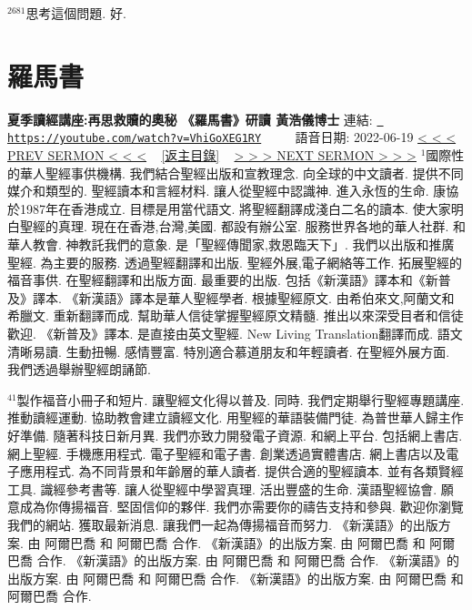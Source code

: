 \documentclass{book}
\begin{document}
$^{2681}$思考這個問題.
好.
\newpage



\section{羅馬書}
\label{sec:VhiGoXEG1RY}
\textbf{夏季讀經講座:再思救贖的奧秘 《羅馬書》研讀 黃浩儀博士}
\newline
\newline
連結: \href{https://youtube.com/watch?v=VhiGoXEG1RY}{\texttt{ https://youtube.com/watch?v=VhiGoXEG1RY}} ~~~~ 語音日期: 2022-06-19 
\newline
\newline
\hyperref[sec:7tQS0En6sh8]{\small{< < < PREV SERMON < < <}}
~
\hyperref[sec:index]{\small{[返主目錄]}}
~
\hyperref[sec:lB_bfqbs0xw]{\small{> > > NEXT SERMON > > >}}
\newline
\newline
$^{1}$國際性的華人聖經事供機構.
我們結合聖經出版和宣教理念.
向全球的中文讀者.
提供不同媒介和類型的.
聖經讀本和言經材料.
讓人從聖經中認識神.
進入永恆的生命.
康協於1987年在香港成立.
目標是用當代語文.
將聖經翻譯成淺白二名的讀本.
使大家明白聖經的真理.
現在在香港,台灣,美國.
都設有辦公室.
服務世界各地的華人社群.
和華人教會.
神教託我們的意象.
是「聖經傳聞家,救恩臨天下」.
我們以出版和推廣聖經.
為主要的服務.
透過聖經翻譯和出版.
聖經外展,電子網絡等工作.
拓展聖經的福音事供.
在聖經翻譯和出版方面.
最重要的出版.
包括《新漢語》譯本和《新普及》譯本.
《新漢語》譯本是華人聖經學者.
根據聖經原文.
由希伯來文,阿蘭文和希臘文.
重新翻譯而成.
幫助華人信徒掌握聖經原文精髓.
推出以來深受目者和信徒歡迎.
《新普及》譯本.
是直接由英文聖經.
New Living Translation翻譯而成.
語文清晰易讀.
生動扭暢.
感情豐富.
特別適合慕道朋友和年輕讀者.
在聖經外展方面.
我們透過舉辦聖經朗誦節.

$^{41}$製作福音小冊子和短片.
讓聖經文化得以普及.
同時.
我們定期舉行聖經專題講座.
推動讀經運動.
協助教會建立讀經文化.
用聖經的華語裝備門徒.
為普世華人歸主作好準備.
隨著科技日新月異.
我們亦致力開發電子資源.
和網上平台.
包括網上書店.
網上聖經.
手機應用程式.
電子聖經和電子書.
創業透過實體書店.
網上書店以及電子應用程式.
為不同背景和年齡層的華人讀者.
提供合適的聖經讀本.
並有各類賢經工具.
識經參考書等.
讓人從聖經中學習真理.
活出豐盛的生命.
漢語聖經協會.
願意成為你傳揚福音.
堅固信仰的夥伴.
我們亦需要你的禱告支持和參與.
歡迎你瀏覽我們的網站.
獲取最新消息.
讓我們一起為傳揚福音而努力.
《新漢語》的出版方案.
由 阿爾巴喬 和 阿爾巴喬 合作.
《新漢語》的出版方案.
由 阿爾巴喬 和 阿爾巴喬 合作.
《新漢語》的出版方案.
由 阿爾巴喬 和 阿爾巴喬 合作.
《新漢語》的出版方案.
由 阿爾巴喬 和 阿爾巴喬 合作.
《新漢語》的出版方案.
由 阿爾巴喬 和 阿爾巴喬 合作.
\end{document}
